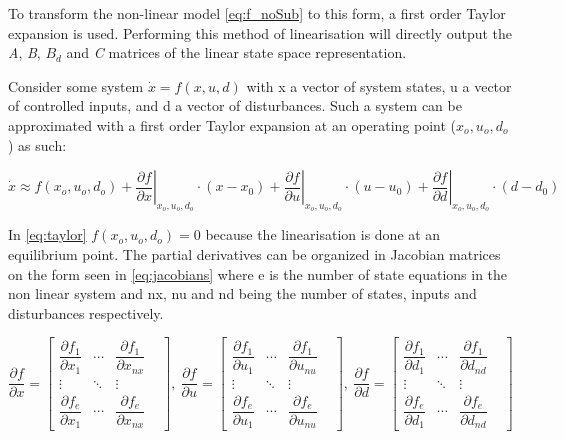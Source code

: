 To transform the non-linear model \cref{eq:f_noSub} to this form, a first order Taylor expansion is used. Performing this method of linearisation will directly output the \textit{A}, \textit{B}, \textit{$B_d$} and \textit{C} matrices of the linear state space representation.

Consider some system $\dot{x} = f(x,u,d)$ with x a vector of system states, u a vector of controlled inputs, and d a vector of disturbances. Such a system can be approximated with a first order Taylor expansion at an operating point ($x_o, u_o, d_o$) as such:

\begin{equation} \label{eq:taylor}
	\dot{x}   \approx   f(x_o, u_o, d_o)   +
	\left. \dfrac{\partial f}{\partial x} \right |_{x_o, u_o, d_o} \cdot (x-x_0) +
	\left. \dfrac{\partial f}{\partial u} \right |_{x_o, u_o, d_o} \cdot (u-u_0) +
	\left. \dfrac{\partial f}{\partial d} \right |_{x_o, u_o, d_o} \cdot (d-d_0)
\end{equation}

In \cref{eq:taylor} $f(x_o, u_o, d_o) = 0$ because the linearisation is done at an equilibrium point. The partial derivatives can be organized in Jacobian matrices on the form seen in \cref{eq:jacobians} where e is the number of state equations in the non linear system and nx, nu and nd being the number of states, inputs and disturbances respectively.

\begin{equation} \label{eq:jacobians}
	\dfrac{\partial f}{\partial x} =
		\begin{bmatrix}
			\dfrac{\partial f_1}{\partial x_1} & \cdots & \dfrac{\partial f_1}{\partial x_{nx}} & \\
			\vdots & \ddots & \vdots & \\
			\dfrac{\partial f_e}{\partial x_1} & \cdots & \dfrac{\partial f_e}{\partial x_{nx}} &
		\end{bmatrix}, \
	\dfrac{\partial f}{\partial u} =
		\begin{bmatrix}
			\dfrac{\partial f_1}{\partial u_1} & \cdots & \dfrac{\partial f_1}{\partial u_{nu}} & \\
			\vdots & \ddots & \vdots & \\
			\dfrac{\partial f_e}{\partial u_1} & \cdots & \dfrac{\partial f_e}{\partial u_{nu}} &
		\end{bmatrix}, \
	\dfrac{\partial f}{\partial d} =
		\begin{bmatrix}
			\dfrac{\partial f_1}{\partial d_1} & \cdots & \dfrac{\partial f_1}{\partial d_{nd}} & \\
			\vdots & \ddots & \vdots & \\
			\dfrac{\partial f_e}{\partial d_1} & \cdots & \dfrac{\partial f_e}{\partial d_{nd}} &
		\end{bmatrix}
\end{equation}

